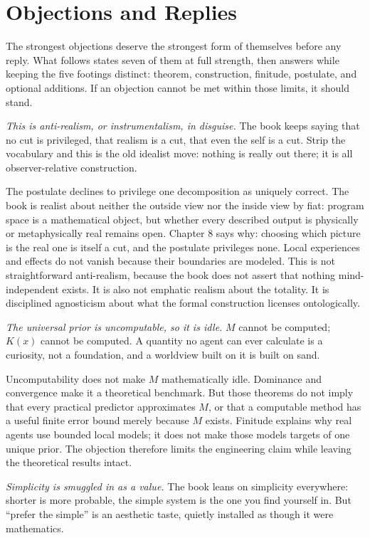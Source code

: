 \chapter{Objections and Replies}\label{app:objections}

The strongest objections deserve the strongest form of themselves before any reply. What follows states seven of them at full strength, then answers while keeping the five footings distinct: theorem, construction, finitude, postulate, and optional additions. If an objection cannot be met within those limits, it should stand.

\emph{This is anti-realism, or instrumentalism, in disguise.} The book keeps saying that no cut is privileged, that realism is a cut, that even the self is a cut. Strip the vocabulary and this is the old idealist move: nothing is really out there; it is all observer-relative construction.

The postulate declines to privilege one decomposition as uniquely correct. The book is realist about neither the outside view nor the inside view by fiat: program space is a mathematical object, but whether every described output is physically or metaphysically real remains open. Chapter 8 says why: choosing which picture is the real one is itself a cut, and the postulate privileges none. Local experiences and effects do not vanish because their boundaries are modeled. This is not straightforward anti-realism, because the book does not assert that nothing mind-independent exists. It is also not emphatic realism about the totality. It is disciplined agnosticism about what the formal construction licenses ontologically.

\emph{The universal prior is uncomputable, so it is idle.} $M$ cannot be computed; $K(x)$ cannot be computed. A quantity no agent can ever calculate is a curiosity, not a foundation, and a worldview built on it is built on sand.

Uncomputability does not make $M$ mathematically idle. Dominance and convergence make it a theoretical benchmark. But those theorems do not imply that every practical predictor approximates $M$, or that a computable method has a useful finite error bound merely because $M$ exists. Finitude explains why real agents use bounded local models; it does not make those models targets of one unique prior. The objection therefore limits the engineering claim while leaving the theoretical results intact.

\emph{Simplicity is smuggled in as a value.} The book leans on simplicity everywhere: shorter is more probable, the simple system is the one you find yourself in. But ``prefer the simple'' is an aesthetic taste, quietly installed as though it were mathematics.

